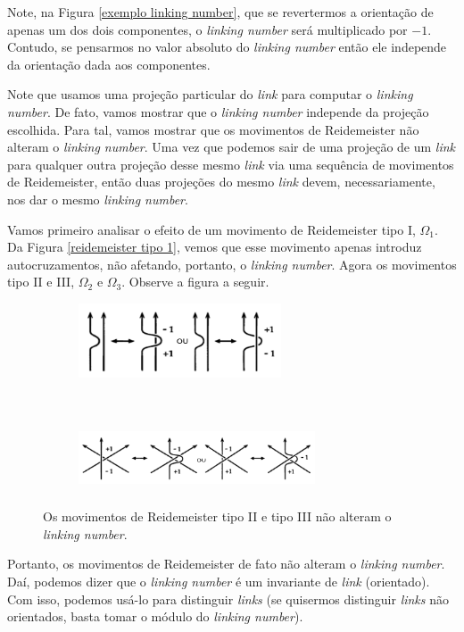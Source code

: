 \documentclass[a4paper,portuguese,11pt,twoside, leqno]{book}
\theoremstyle{definition}
\begin{document}
	\par\vspace{0.3cm} Note, na Figura \eqref{exemplo linking number}, que se revertermos a orientação de apenas um dos dois componentes, o \textit{linking number} será multiplicado por $-1$. Contudo, se pensarmos no valor absoluto do \textit{linking number} então ele independe da orientação dada aos componentes.
	\par\vspace{0.3cm} Note que usamos uma projeção particular do \textit{link} para computar o \textit{linking number}. De fato, vamos mostrar que o \textit{linking number} independe da projeção escolhida. Para tal, vamos mostrar que os movimentos de Reidemeister não alteram o \textit{linking number}. Uma vez que podemos sair de uma projeção de um \textit{link} para qualquer outra projeção desse mesmo \textit{link} via uma sequência de movimentos de Reidemeister, então duas projeções do mesmo \textit{link} devem, necessariamente, nos dar o mesmo \textit{linking number}.
	\par\vspace{0.3cm} Vamos primeiro analisar o efeito de um movimento de Reidemeister tipo I, $\Omega_1$. Da Figura \eqref{reidemeister tipo 1}, vemos que esse movimento apenas introduz autocruzamentos, não afetando, portanto, o \textit{linking number}. Agora os movimentos tipo II e III, $\Omega_2$ e $\Omega_3$. Observe a figura a seguir.
	\begin{figure}[H]
		\centering
		\begin{subfigure}[t]{0.5\textwidth}
			\centering
			\includegraphics[width=6cm]{reidemeister2linkingnumber.png}
			\caption{}
			\label{omega2}
		\end{subfigure}%
		~ 
		\begin{subfigure}[t]{0.5\textwidth}
			\centering
			\includegraphics[width=7cm, height=2cm]{reidemeister3linkingnumber.png}
			\caption{}
			\label{omega3}
		\end{subfigure}
		\caption{Os movimentos de Reidemeister tipo II e tipo III não alteram o \textit{linking number}.}
	\end{figure}
	\par\vspace{0.3cm} Portanto, os movimentos de Reidemeister de fato não alteram o \textit{linking number}. Daí, podemos dizer que o \textit{linking number} é um invariante de \textit{link} (orientado). Com isso, podemos usá-lo para distinguir \textit{links} (se quisermos distinguir \textit{links} não orientados, basta tomar o módulo do \textit{linking number}).
	
\end{document}
